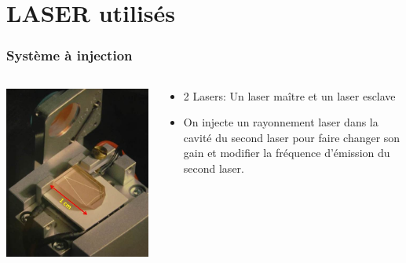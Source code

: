 \documentclass{beamer}
\begin{document}
\section{LASER utilisés}
\begin{frame}
	\frametitle{Système à injection}
	\begin{columns}
		\begin{column}{0.5\textwidth}
			\includegraphics[width=\textwidth]{Docs/NPRO.png}
		\end{column}
			

		\begin{column}{0.5\textwidth}
				\begin{itemize}
					\item 2 Lasers: Un laser maître et un laser esclave
					\item On injecte un rayonnement laser dans la cavité du second laser pour faire changer son gain et modifier la fréquence d'émission du second laser.
				\end{itemize}
		\end{column}
	\end{columns}
\end{frame}
\end{document}
